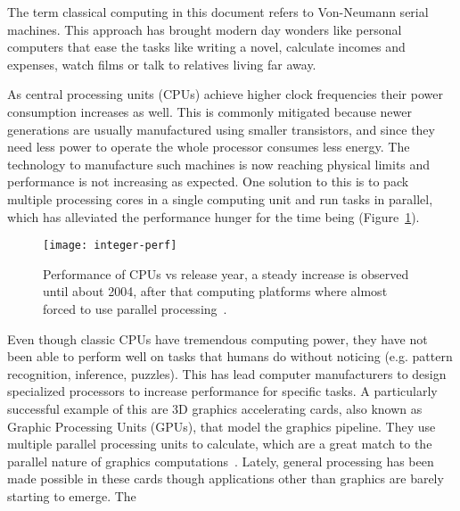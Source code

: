 The term classical computing in this document refers to Von-Neumann serial machines. This approach has brought modern day wonders like personal computers that ease the tasks like writing a novel, calculate incomes and expenses, watch films or talk to relatives living far away. 

As central processing units (CPUs) achieve higher clock frequencies their power consumption increases as well. This is commonly mitigated because newer generations are usually manufactured using smaller transistors, and since they need less power to operate the whole processor consumes less energy. The technology to manufacture such machines is now reaching physical limits and performance is not increasing as expected. One solution to this is to pack multiple processing cores in a single computing unit and run tasks in parallel, which has alleviated the performance hunger for the time being (Figure~\ref{fig:comp:moore}). 

\begin{figure}[h]
  \begin{center}
    \texttt{[image: integer-perf]}
    \caption{Performance of CPUs vs release year, a steady increase is observed until about 2004, after that computing platforms where almost forced to use parallel processing~\cite{int-perf-images}. }
    \label{fig:comp:moore}
  \end{center}
\end{figure}

Even though classic CPUs have tremendous computing power, they have not been able to perform well on tasks that humans do without noticing (e.g. pattern recognition, inference, puzzles). This has lead computer manufacturers to design specialized processors to increase performance for specific tasks. A particularly successful example of this are 3D graphics accelerating cards, also known as Graphic Processing Units (GPUs), that model the graphics pipeline. They use multiple parallel processing units to calculate, which are a great match to the parallel nature of graphics computations~\cite{nickolls2010gpu,chen2009gpu}. Lately, general processing has been made possible in these cards though applications other than graphics are barely starting to emerge. The 



